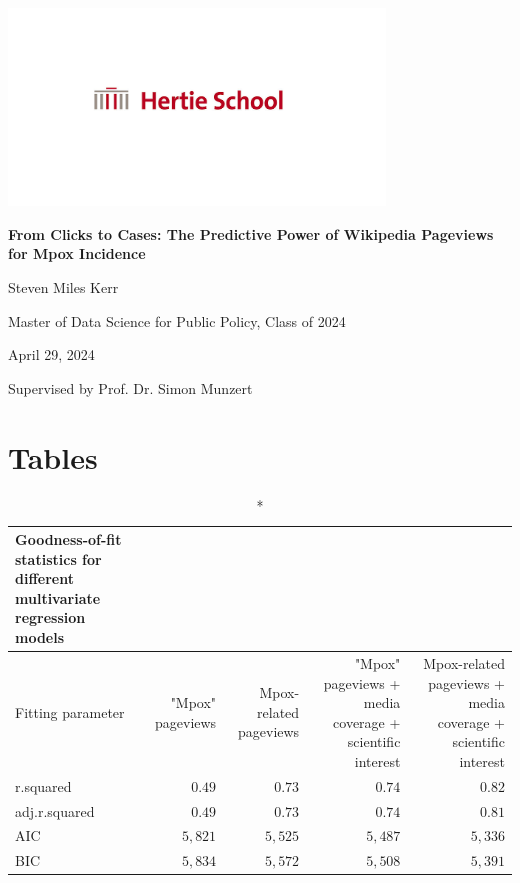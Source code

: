 \documentclass[
  12pt,
]{article}
\author{Steven Miles Kerr}
\date{28 April 2024}
\begin{document}
\begin{titlepage}
    \centering
    \includegraphics[width=0.75\textwidth]{images/hertie-school-logo.jpg}
    \vspace*{\fill}
    
    \textbf{From Clicks to Cases: The Predictive Power of Wikipedia Pageviews for Mpox Incidence}

    \vspace{2.5cm}

    Steven Miles Kerr

    \vspace{1cm}
    
    Master of Data Science for Public Policy, Class of 2024\\
    
    \vspace{0.5cm}

    April 29, 2024\\

    \vspace*{\fill}

    Supervised by Prof. Dr. Simon Munzert

\end{titlepage}

\tableofcontents
\thispagestyle{empty}
\newpage

\setcounter{page}{1}

\section{Tables}\label{tables}

\begin{longtable*}{lrrrr}
\caption*{
{\large Goodness-of-fit statistics for different multivariate regression models}
} \\ 
\toprule
Fitting parameter & "Mpox" pageviews & Mpox-related pageviews & "Mpox" pageviews + media coverage + scientific interest & Mpox-related pageviews + media coverage + scientific interest \\ 
\midrule\addlinespace[2.5pt]
r.squared & $0.49$ & $0.73$ & $0.74$ & $0.82$ \\ 
adj.r.squared & $0.49$ & $0.73$ & $0.74$ & $0.81$ \\ 
AIC & $5,821$ & $5,525$ & $5,487$ & $5,336$ \\ 
BIC & $5,834$ & $5,572$ & $5,508$ & $5,391$ \\ 
\bottomrule
\end{longtable*}
\end{document}
